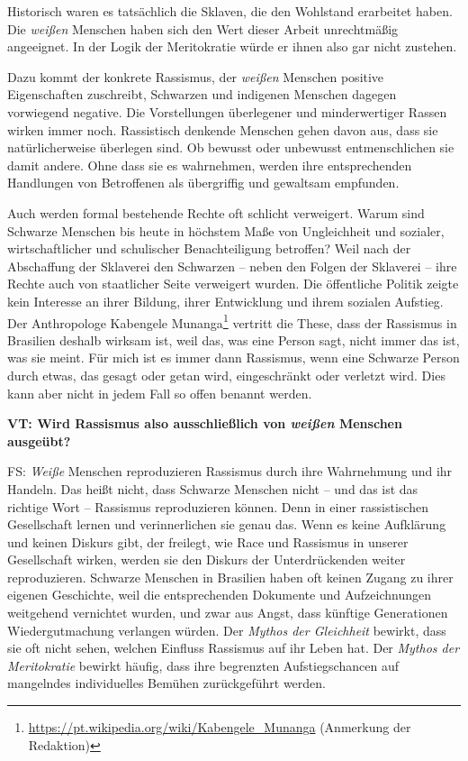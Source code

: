 \documentclass[a4paper,
fontsize=11pt,
oneside,
numbers=noperiodatend,
parskip=half-,
bibliography=totoc,
final
]{scrartcl}
\begin{document}
Historisch waren es tatsächlich die Sklaven, die den Wohlstand
erarbeitet haben. Die \emph{weißen} Menschen haben sich den Wert dieser
Arbeit unrechtmäßig angeeignet. In der Logik der Meritokratie würde er
ihnen also gar nicht zustehen.

Dazu kommt der konkrete Rassismus, der \emph{weißen} Menschen positive
Eigenschaften zuschreibt, Schwarzen und indigenen Menschen dagegen
vorwiegend negative. Die Vorstellungen überlegener und minderwertiger
Rassen wirken immer noch. Rassistisch denkende Menschen gehen davon aus,
dass sie natürlicherweise überlegen sind. Ob bewusst oder unbewusst
entmenschlichen sie damit andere. Ohne dass sie es wahrnehmen, werden
ihre entsprechenden Handlungen von Betroffenen als übergriffig und
gewaltsam empfunden.

Auch werden formal bestehende Rechte oft schlicht verweigert. Warum sind
Schwarze Menschen bis heute in höchstem Maße von Ungleichheit und
sozialer, wirtschaftlicher und schulischer Benachteiligung betroffen?
Weil nach der Abschaffung der Sklaverei den Schwarzen -- neben den
Folgen der Sklaverei -- ihre Rechte auch von staatlicher Seite
verweigert wurden. Die öffentliche Politik zeigte kein Interesse an
ihrer Bildung, ihrer Entwicklung und ihrem sozialen Aufstieg. Der
Anthropologe Kabengele Munanga\footnote{\url{https://pt.wikipedia.org/wiki/Kabengele_Munanga}
  (Anmerkung der Redaktion)} vertritt die These, dass der Rassismus in
Brasilien deshalb wirksam ist, weil das, was eine Person sagt, nicht
immer das ist, was sie meint. Für mich ist es immer dann Rassismus, wenn
eine Schwarze Person durch etwas, das gesagt oder getan wird,
eingeschränkt oder verletzt wird. Dies kann aber nicht in jedem Fall so
offen benannt werden.

\textbf{VT: Wird Rassismus also ausschließlich von \emph{weißen}
Menschen ausgeübt?}

FS: \emph{Weiße} Menschen reproduzieren Rassismus durch ihre Wahrnehmung
und ihr Handeln. Das heißt nicht, dass Schwarze Menschen nicht -- und
das ist das richtige Wort -- Rassismus reproduzieren können. Denn in
einer rassistischen Gesellschaft lernen und verinnerlichen sie genau
das. Wenn es keine Aufklärung und keinen Diskurs gibt, der freilegt, wie
Race und Rassismus in unserer Gesellschaft wirken, werden sie den
Diskurs der Unterdrückenden weiter reproduzieren. Schwarze Menschen in
Brasilien haben oft keinen Zugang zu ihrer eigenen Geschichte, weil die
entsprechenden Dokumente und Aufzeichnungen weitgehend vernichtet
wurden, und zwar aus Angst, dass künftige Generationen Wiedergutmachung
verlangen würden. Der \emph{Mythos der Gleichheit} bewirkt, dass sie oft
nicht sehen, welchen Einfluss Rassismus auf ihr Leben hat. Der
\emph{Mythos der Meritokratie} bewirkt häufig, dass ihre begrenzten
Aufstiegschancen auf mangelndes individuelles Bemühen zurückgeführt
werden.
\end{document}
